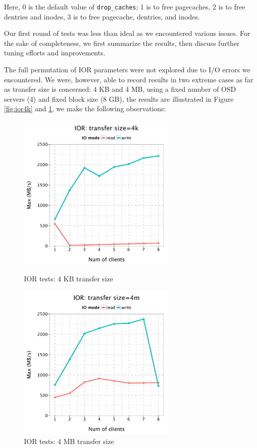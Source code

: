 \documentclass{article}
\begin{document}
Here, 0 is the default value of \verb!drop_caches!; 1 is to free pagecaches, 2
is to free dentries and inodes, 3 is to free pagecache, dentries, and inodes.


Our first round of tests was less than ideal as we encountered various issues. For
the sake of completeness, we first summarize the results, then discuss
further tuning efforts and improvements.

The full permutation of IOR parameters were not explored due to I/O errors we encountered.
We were, however, able to record results in two extreme cases as far as
transfer size is concerned: 4 KB and 4 MB, using a fixed number of OSD servers
(4) and fixed block size (8 GB), the results are illustrated in Figure
\ref{fig:ior4k} and \ref{fig:ior4m}, we make the following observations:



\begin{figure}[H]
\centering
\begin{minipage}[t]{0.5\linewidth}
\centering
\includegraphics[width=3in]{data/ior_4k}
\caption{IOR tests: 4 KB transfer size}
\label{fig:ior4k}
\end{minipage}%
\begin{minipage}[t]{0.5\linewidth}
\centering
\includegraphics[width=3in]{data/ior_4m}
\caption{IOR tests: 4 MB transfer size}
\label{fig:ior4m}
\end{minipage}%
\end{figure}
\end{document}
